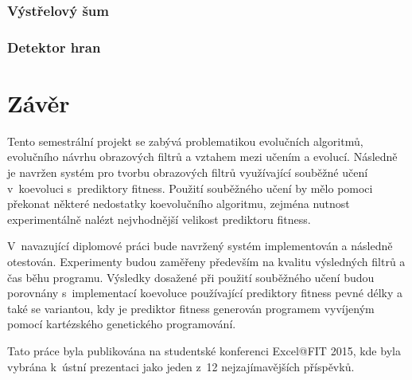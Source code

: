 


\subsection{Výstřelový šum}

\subsection{Detektor hran}



\chapter{Závěr}
\label{chConclusions}

Tento semestrální projekt se zabývá problematikou evolučních algoritmů, evolučního návrhu obrazových filtrů a vztahem mezi učením a evolucí. Následně je navržen systém pro tvorbu obrazových filtrů využívající souběžné učení v~koevoluci s~prediktory fitness. Použití souběžného učení by mělo pomoci překonat některé nedostatky koevolučního algoritmu, zejména nutnost experimentálně nalézt nejvhodnější velikost prediktoru fitness.


V~navazující diplomové práci bude navržený systém implementován a následně otestován. Experimenty budou zaměřeny především na kvalitu výsledných filtrů a čas běhu programu. Výsledky dosažené při použití souběžného učení budou porovnány s~implementací koevoluce používající prediktory fitness pevné délky a také se variantou, kdy je prediktor fitness generován programem vyvíjeným pomocí kartézského genetického programování.

Tato práce byla publikována na studentské konferenci Excel@FIT 2015, kde byla vybrána k~ústní prezentaci jako jeden z~12 nejzajímavějších příspěvků.
